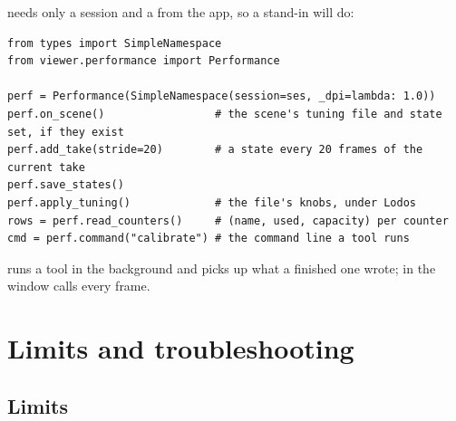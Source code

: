  needs only a session and a  from the app, so a stand-in will do:

\begin{lstlisting}
from types import SimpleNamespace
from viewer.performance import Performance

perf = Performance(SimpleNamespace(session=ses, _dpi=lambda: 1.0))
perf.on_scene()                 # the scene's tuning file and state set, if they exist
perf.add_take(stride=20)        # a state every 20 frames of the current take
perf.save_states()
perf.apply_tuning()             # the file's knobs, under Lodos
rows = perf.read_counters()     # (name, used, capacity) per counter
cmd = perf.command("calibrate") # the command line a tool runs
\end{lstlisting}

 runs a tool in the background and  picks up what a finished one wrote; in the window  calls  every frame.

\section{Limits and troubleshooting}\label{sec:limits}

\subsection{Limits}\label{sec:limitlist}

